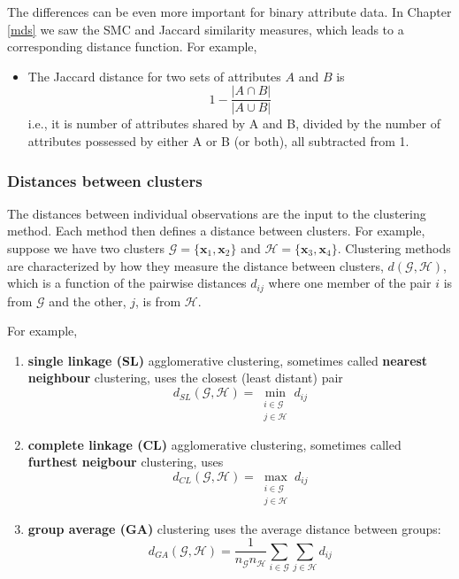 \documentclass[
]{book}
\providecommand{\tightlist}{%
  \setlength{\itemsep}{0pt}\setlength{\parskip}{0pt}}
\theoremstyle{definition}
\theoremstyle{definition}
\theoremstyle{definition}
\theoremstyle{definition}
\theoremstyle{remark}
\begin{document}
The differences can be even more important for binary attribute data. In Chapter \ref{mds} we saw the SMC and Jaccard similarity measures, which leads to a corresponding distance function. For example,

\begin{itemize}
\tightlist
\item
  The Jaccard distance for two sets of attributes \(A\) and \(B\) is
  \[1- \frac{|A \cap B|}{|A\cup B|}\]
  i.e., it is number of attributes shared by A and B, divided by the number of attributes possessed by either A or B (or both), all subtracted from 1.
\end{itemize}

\hypertarget{distances-between-clusters}{%
\subsubsection{Distances between clusters}\label{distances-between-clusters}}

The distances between individual observations are the input to the clustering method. Each method then defines a distance between clusters. For example, suppose we have two clusters \(\mathcal{G}=\{\mathbf x_1, \mathbf x_2\}\) and \(\mathcal{H}=\{\mathbf x_3, \mathbf x_4\}\). Clustering methods are characterized by how they measure the distance between clusters, \(d(\mathcal{G}, \mathcal{H})\), which is a function of the pairwise distances \(d_{ij}\) where one member of the pair \(i\) is from \(\mathcal{G}\) and the other, \(j\), is from \(\mathcal{H}\).

For example,

\begin{enumerate}
\def\labelenumi{\arabic{enumi}.}
\item
  \textbf{single linkage (SL)} agglomerative clustering, sometimes called \textbf{nearest neighbour} clustering, uses the closest (least distant) pair
  \[d_{SL}(\mathcal{G}, \mathcal{H}) = \min_{\substack{i\in \mathcal{G}\\ j\in \mathcal{H}}} d_{ij}\]
\item
  \textbf{complete linkage (CL)} agglomerative clustering, sometimes called \textbf{furthest neigbour} clustering, uses
  \[d_{CL}(\mathcal{G}, \mathcal{H}) = \max_{\substack{i\in \mathcal{G}\\ j\in \mathcal{H}}} d_{ij}\]
\item
  \textbf{group average (GA)} clustering uses the average distance between groups:
  \[d_{GA}(\mathcal{G}, \mathcal{H}) = \frac{1}{n_\mathcal{G}n_\mathcal{H}}\sum_{i\in\mathcal{G}}\sum_{j\in\mathcal{H}} d_{ij}\]
\end{enumerate}
\end{document}
